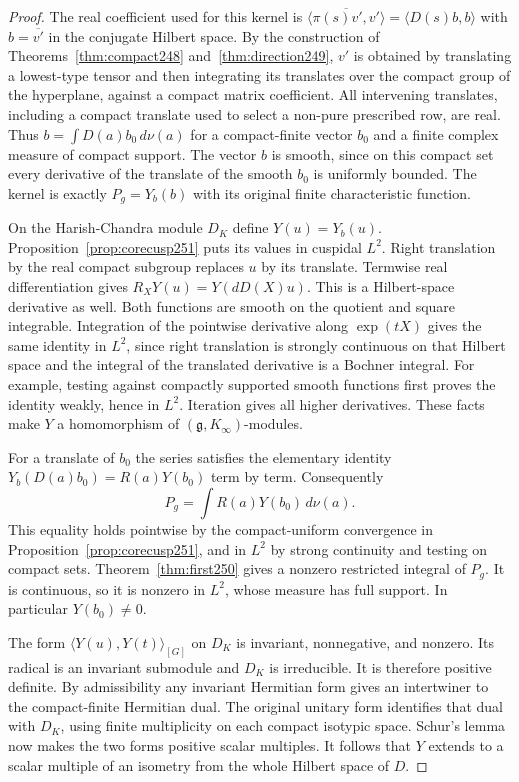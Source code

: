 \documentclass[a4paper,11pt]{article}
\theoremstyle{definition}
\theoremstyle{remark}
\numberwithin{equation}{section}
\begin{document}
\begin{proof}
The real coefficient used for this kernel is
\(\overline{\langle\pi(s)v',v'\rangle}=\langle D(s)b,b\rangle\)
with \(b=\overline{v'}\) in the conjugate Hilbert space. By the
construction of Theorems~\ref{thm:compact248} and~\ref{thm:direction249},
\(v'\) is obtained by translating a lowest-type tensor and then
integrating its translates over the compact group of the hyperplane,
against a compact matrix coefficient. All intervening translates,
including a compact translate used to select a non-pure prescribed row,
are real. Thus \(b=\int D(a)b_0\,d\nu(a)\) for a compact-finite vector
\(b_0\) and a finite complex measure of compact support. The vector
\(b\) is smooth, since on this compact set every derivative of the
translate of the smooth \(b_0\) is uniformly bounded. The kernel is
exactly \(P_g=Y_b(b)\) with its original finite characteristic function.

On the Harish-Chandra module \(D_K\) define \(Y(u)=Y_b(u)\).
Proposition~\ref{prop:corecusp251} puts its values in cuspidal \(L^2\).
Right translation by the real compact subgroup replaces \(u\) by its
translate. Termwise real differentiation gives \(R_XY(u)=Y(dD(X)u)\).
This is a Hilbert-space derivative as well. Both functions are smooth
on the quotient and square integrable. Integration of the pointwise
derivative along \(\exp(tX)\) gives the same identity in \(L^2\),
since right translation is strongly continuous on that Hilbert space
and the integral of the translated derivative is a Bochner integral.
For example, testing against compactly supported smooth functions
first proves the identity weakly, hence in \(L^2\). Iteration gives
all higher derivatives. These facts make \(Y\) a homomorphism of
\((\mathfrak g,K_\infty)\)-modules.

For a translate of \(b_0\) the series satisfies the elementary
identity \(Y_b(D(a)b_0)=R(a)Y(b_0)\) term by term. Consequently
\[
            P_g=\int R(a)Y(b_0)\,d\nu(a).
\]
This equality holds pointwise by the compact-uniform convergence in
Proposition~\ref{prop:corecusp251}, and in \(L^2\) by strong continuity
and testing on compact sets. Theorem~\ref{thm:first250} gives a nonzero
restricted integral of \(P_g\). It is continuous, so it is nonzero
in \(L^2\), whose measure has full support. In particular \(Y(b_0)\ne0\).

The form \(\langle Y(u),Y(t)\rangle_{[G]}\) on \(D_K\) is invariant,
nonnegative, and nonzero. Its radical is an invariant submodule and
\(D_K\) is irreducible. It is therefore positive definite. By
admissibility any invariant Hermitian form gives an intertwiner to
the compact-finite Hermitian dual. The original unitary form
identifies that dual with \(D_K\), using finite multiplicity on each
compact isotypic space. Schur's lemma now makes the two forms positive
scalar multiples. It follows that \(Y\) extends to a scalar multiple
of an isometry from the whole Hilbert space of \(D\).


\end{proof}
\end{document}
